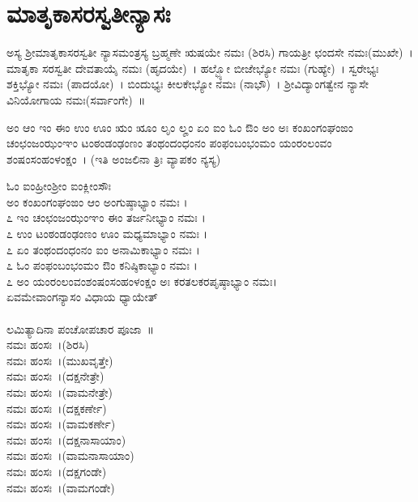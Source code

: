 \section{ಮಾತೃಕಾಸರಸ್ವತೀನ್ಯಾಸಃ}
ಅಸ್ಯ ಶ್ರೀಮಾತೃಕಾಸರಸ್ವತೀ ನ್ಯಾಸಮಂತ್ರಸ್ಯ ಬ್ರಹ್ಮಣೇ ಋಷಯೇ ನಮಃ (ಶಿರಸಿ) ಗಾಯತ್ರೀ ಛಂದಸೇ ನಮಃ(ಮುಖೇ)~। ಮಾತೃಕಾ ಸರಸ್ವತೀ ದೇವತಾಯೈ ನಮಃ (ಹೃದಯೇ)~। ಹಲ್ಭ್ಯೋ ಬೀಜೇಭ್ಯೋ ನಮಃ (ಗುಹ್ಯೇ)~। ಸ್ವರೇಭ್ಯಃ ಶಕ್ತಿಭ್ಯೋ ನಮಃ (ಪಾದಯೋ)~। ಬಿಂದುಭ್ಯಃ ಕೀಲಕೇಭ್ಯೋ ನಮಃ (ನಾಭೌ)~। ಶ್ರೀವಿದ್ಯಾಂಗತ್ವೇನ ನ್ಯಾಸೇ ವಿನಿಯೋಗಾಯ ನಮಃ(ಸರ್ವಾಂಗೇ)~॥

ಅಂ ಆಂ ಇಂ ಈಂ ಉಂ ಊಂ ಋಂ ೠಂ ಲೃಂ ಲೄಂ ಏಂ ಐಂ ಓಂ ಔಂ ಅಂ ಅಃ ಕಂಖಂಗಂಘಂಙಂ ಚಂಛಂಜಂಝಂಞಂ ಟಂಠಂಡಂಢಂಣಂ ತಂಥಂದಂಧಂನಂ ಪಂಫಂಬಂಭಂಮಂ ಯಂರಂಲಂವಂ ಶಂಷಂಸಂಹಂಳಂಕ್ಷಂ~। (ಇತಿ ಅಂಜಲಿನಾ ತ್ರಿಃ ವ್ಯಾಪಕಂ ನ್ಯಸ್ಯ)

ಓಂ ಐಂಹ್ರೀಂಶ್ರೀಂ ಐಂಕ್ಲೀಂಸೌಃ\\ಅಂ ಕಂಖಂಗಂಘಂಙಂ ಆಂ ಅಂಗುಷ್ಠಾಭ್ಯಾಂ ನಮಃ ।\\
೭ ಇಂ ಚಂಛಂಜಂಝಂಞಂ ಈಂ ತರ್ಜನೀಭ್ಯಾಂ ನಮಃ ।\\
೭ ಉಂ ಟಂಠಂಡಂಢಂಣಂ ಊಂ ಮಧ್ಯಮಾಭ್ಯಾಂ ನಮಃ ।\\
೭ ಏಂ ತಂಥಂದಂಧಂನಂ ಐಂ ಅನಾಮಿಕಾಭ್ಯಾಂ ನಮಃ ।\\
೭ ಓಂ ಪಂಫಂಬಂಭಂಮಂ ಔಂ ಕನಿಷ್ಠಿಕಾಭ್ಯಾಂ ನಮಃ ।\\
೭ ಅಂ ಯಂರಂಲಂವಂಶಂಷಂಸಂಹಂಳಂಕ್ಷಂ ಅಃ ಕರತಲಕರಪೃಷ್ಠಾಭ್ಯಾಂ ನಮಃ।\\
ಏವಮೇವಾಂಗನ್ಯಾಸಂ ವಿಧಾಯ ಧ್ಯಾಯೇತ್ \\
\\
ಲಮಿತ್ಯಾದಿನಾ ಪಂಚೋಪಚಾರ ಪೂಜಾ~॥\\
 ನಮಃ ಹಂಸಃ~।(ಶಿರಸಿ)\\
 ನಮಃ ಹಂಸಃ~।(ಮುಖವೃತ್ತೇ)\\
 ನಮಃ ಹಂಸಃ~।(ದಕ್ಷನೇತ್ರೇ)\\
 ನಮಃ ಹಂಸಃ~।(ವಾಮನೇತ್ರೇ)\\
 ನಮಃ ಹಂಸಃ~।(ದಕ್ಷಕರ್ಣೇ)\\
 ನಮಃ ಹಂಸಃ~।(ವಾಮಕರ್ಣೇ)\\
 ನಮಃ ಹಂಸಃ~।(ದಕ್ಷನಾಸಾಯಾಂ)\\
 ನಮಃ ಹಂಸಃ~।(ವಾಮನಾಸಾಯಾಂ)\\
 ನಮಃ ಹಂಸಃ~।(ದಕ್ಷಗಂಡೇ)\\
 ನಮಃ ಹಂಸಃ~।(ವಾಮಗಂಡೇ)\\
